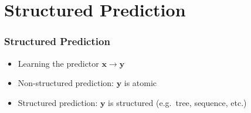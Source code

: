 \documentclass[10pt]{beamer}
\begin{document}

\section{Structured Prediction}
\begin{frame}
\frametitle{Structured Prediction}

\begin{itemize}
        \item Learning the predictor $\mathbf{x} \rightarrow \mathbf{y}$
        \item Non-structured prediction: $\mathbf{y}$ is atomic
        \item Structured prediction: $\mathbf{y}$ is structured (e.g.\ tree, sequence, etc.)
\end{itemize}

\end{frame}
\end{document}
